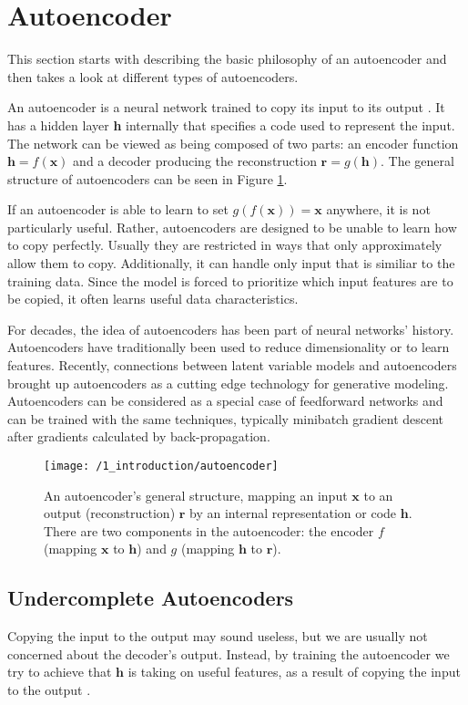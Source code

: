 \section{Autoencoder}\label{sec:autoencoder}
This section starts with describing the basic philosophy of an autoencoder and
then takes a look at different types of autoencoders.

An autoencoder is a neural network trained to copy its input to its output
\cite{Goodfellow-et-al-2016}. It has a hidden layer \textbf{h} internally that
specifies a code used to represent the input. The network can be viewed as being
composed of two parts: an encoder function $\textbf{h} = f(\textbf{x})$ and a
decoder producing the reconstruction $\textbf{r} = g(\textbf{h})$. The general
structure of autoencoders can be seen in Figure \ref{fig:autoencoder}.

If an autoencoder is able to learn to set $g(f(\textbf{x}))=\textbf{x}$
anywhere, it is not particularly useful. Rather, autoencoders are designed to be
unable to learn how to copy perfectly. Usually they are restricted in ways that
only approximately allow them to copy. Additionally, it can handle only input
that is similiar to the training data. Since the model is forced to prioritize
which input features are to be copied, it often learns useful data characteristics. 

For decades, the idea of autoencoders has been part of neural networks' history.
Autoencoders have traditionally been used to reduce dimensionality or to learn
features. Recently, connections between latent variable models and autoencoders
brought up autoencoders as a cutting edge technology for generative modeling.
Autoencoders can be considered as a special case of feedforward networks and can
be trained with the same techniques, typically minibatch gradient descent after
gradients calculated by back-propagation. 

\begin{figure}[h]
    \centering
    \texttt{[image: /1\_introduction/autoencoder]}
    \caption{An autoencoder's general structure, mapping an input $\textbf{x}$
    to an output (reconstruction) $\textbf{r}$ by an internal representation or
    code $\textbf{h}$. There are two components in the autoencoder: the encoder
    $f$ (mapping $\textbf{x}$ to $\textbf{h}$) and $g$ (mapping $\textbf{h}$ to
    $\textbf{r}$).}
    \label{fig:autoencoder}
\end{figure}


\subsection{Undercomplete Autoencoders}
Copying the input to the output may sound useless, but we are usually not
concerned about the decoder's output. Instead, by training the autoencoder we
try to achieve that $ \textbf{h}$ is taking on useful features, as a result of
copying the input to the output \cite{vincent2010stacked}.

